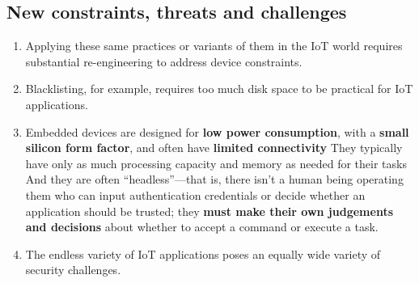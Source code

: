 \documentclass{article}
\begin{document}
\begin{multicols}{2}
\subsection*{New constraints, threats and challenges}
\begin{enumerate}
\item Applying these same practices or variants of them in the IoT world requires substantial re-engineering to address device constraints.
\item Blacklisting, for example, requires too much disk space to be practical for IoT applications.
\item Embedded devices are designed for \textbf{low
power consumption}, with a \textbf{small silicon form factor}, and often have \textbf{limited connectivity} They typically have only as much processing capacity and memory as needed for their tasks And they
are often “headless”—that is, there isn’t a human being operating them who can input authentication credentials or decide whether an application should be trusted; they \textbf{must make their own judgements and decisions} about whether to accept a command or execute a task.
\item The endless variety of IoT applications poses an equally wide variety of security challenges.


\end{enumerate}
\end{multicols}
\end{document}
